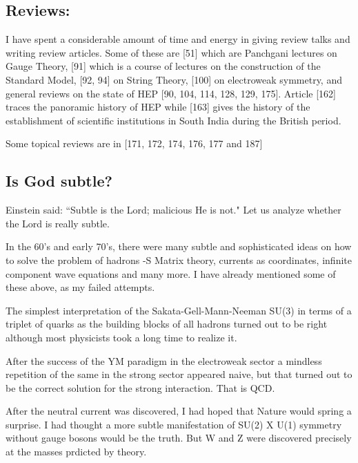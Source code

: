 \vspace{-\topsep}
\subsection*{Reviews:}

I have spent a considerable amount of time and energy in giving review 
talks and writing review articles. Some of these are [51] which are 
Panchgani lectures on Gauge Theory, [91] which is a course of lectures 
on the construction of the Standard Model, [92, 94] on String Theory, 
[100] on electroweak symmetry, and general reviews on the state of HEP 
[90, 104, 114, 128, 129, 175]. Article [162] traces the panoramic history of 
HEP while [163] gives the history of the establishment of scientific 
institutions in South India during the British period.

Some topical reviews are in [171, 172, 174, 176, 177 and 187]

\vspace{-\topsep}
\subsection*{Is God subtle?}

Einstein said: ``Subtle is the Lord; malicious He is not." Let us analyze 
whether the Lord is really subtle.
\smallskip

In the 60's and early 70's, there were many subtle and sophisti\-cated 
ideas on how to solve the problem of hadrons -S Matrix theory, currents 
as coordinates, infinite component wave equations and many more. I have 
already mentioned some of these above, as my failed attempts.
\smallskip

The simplest interpretation of the Sakata-Gell-Mann-Neeman SU(3) in 
terms of a triplet of quarks as the building blocks of all hadrons 
turned out to be right although most physicists took a long time to 
realize it.
\smallskip

After the success of the YM paradigm in the electroweak sector a 
mindless repetition of the same in the strong sector appeared naive, but 
that turned out to be the correct solution for the strong interaction. 
That is QCD.
\smallskip

After the neutral current was discovered, I had hoped that Nature would 
spring a surprise. I had thought a more subtle manifestation of SU(2) X 
U(1) symmetry without gauge bosons would be the truth. But W and Z were 
discovered precisely at the masses prdicted by theory.
\smallskip

